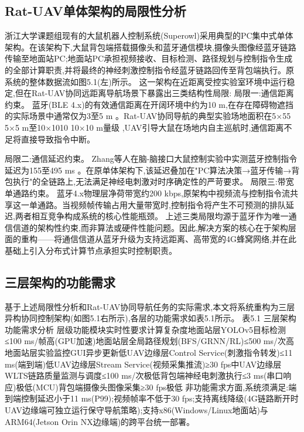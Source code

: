 \subsection{Rat-UAV单体架构的局限性分析}浙江大学课题组现有的大鼠机器人控制系统(Superowl)采用典型的PC集中式单体架构。在该架构下,大鼠背包端搭载摄像头和蓝牙通信模块,摄像头图像经蓝牙链路传输至地面站PC;地面站PC承担视频接收、目标检测、路径规划与控制指令生成的全部计算职责,并将最终的神经刺激控制指令经蓝牙链路回传至背包端执行。原系统的整体数据流如图5.1(左)所示。
这一架构在近距离受控实验室环境中运行稳定,但在Rat-UAV协同远距离导航场景下暴露出三类结构性局限:
局限一:通信距离约束。 蓝牙(BLE 4.x)的有效通信距离在开阔环境中约为10 m,在存在障碍物遮挡的实际场景中通常仅为3至5 m \cite{feng2007remote}。Rat-UAV协同导航的典型实验场地面积在5×55 
5×5 m至10×1010 
10×10 m量级 \cite{zheng2024ratuav},UAV引导大鼠在场地内自主巡航时,通信距离不足将直接导致指令中断。

局限二:通信延迟约束。 Zhang等人在脑-脑接口大鼠控制实验中实测蓝牙控制指令延迟为155至495 ms \cite{zhang2019bci}。在原单体架构下,该延迟叠加在"PC算法决策→蓝牙传输→背包执行"的全链路上,无法满足神经电刺激对时序确定性的严苛要求。
局限三:带宽单通路约束。 蓝牙4.x物理层净荷带宽约200 kbps,原架构中视频流与控制指令流共享这一单通路。当视频帧传输占用大量带宽时,控制指令将产生不可预测的排队延迟,两者相互竞争构成系统的核心性能瓶颈。
上述三类局限均源于蓝牙作为唯一通信信道的架构性约束,而非算法或硬件性能问题。因此,解决方案的核心在于架构层面的重构——将通信信道从蓝牙升级为支持远距离、高带宽的4G蜂窝网络,并在此基础上引入分布式计算节点承担实时控制职责。

\subsection{三层架构的功能需求}
基于上述局限性分析和Rat-UAV协同导航任务的实际需求,本文将系统重构为三层异构协同控制架构(如图5.1右所示),各层的功能需求如表5.1所示。
表5.1 三层架构功能需求分析
层级功能模块实时性要求计算复杂度地面站层YOLOv5目标检测≤100 ms/帧高(GPU加速)地面站层全局路径规划(BFS/GRNN/RL)≤500 ms/次高地面站层实验监控GUI异步更新低UAV边缘层Control Service(刺激指令转发)≤11 ms(端到端)低UAV边缘层Stream Service(视频采集推流)≥30 fps中UAV边缘层WLTS链路质量监测与调度≤100 ms/次极低背包端神经电刺激执行≤3 ms(串口响应)极低(MCU)背包端摄像头图像采集≥30 fps极低
非功能需求方面,系统须满足:端到端控制延迟小于11 ms(P99);视频帧率不低于30 fps;支持离线降级(4G链路断开时UAV边缘端可独立运行保守导航策略);支持x86(Windows/Linux地面站)与ARM64(Jetson Orin NX边缘端)的跨平台统一部署。
